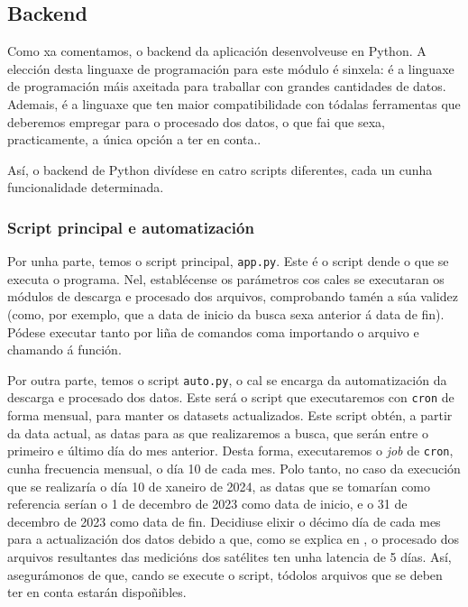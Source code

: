 \subsection{Backend}\label{backend}
Como xa comentamos, o backend da aplicación desenvolveuse en Python. A elección desta linguaxe de programación para este módulo é sinxela: é a linguaxe de programación máis axeitada
para traballar con grandes cantidades de datos. Ademais, é a linguaxe que ten maior compatibilidade con tódalas ferramentas que deberemos empregar para o procesado dos datos, o que
fai que sexa, practicamente, a única opción a ter en conta..

Así, o backend de Python divídese en catro scripts diferentes, cada un cunha funcionalidade determinada.

\subsubsection{Script principal e automatización}\label{app}
Por unha parte, temos o script principal, \texttt{app.py}. Este é o script dende o que se executa o programa. Nel, establécense os parámetros cos cales se executaran os módulos de
descarga e procesado dos arquivos, comprobando tamén a súa validez (como, por exemplo, que a data de inicio da busca sexa anterior á data de fin). Pódese executar tanto por liña de comandos
coma importando o arquivo e chamando á función.

Por outra parte, temos o script \texttt{auto.py}, o cal se encarga da automatización da descarga e procesado dos datos. Este será o script que executaremos con \texttt{cron} de forma mensual,
para manter os datasets actualizados. Este script obtén, a partir da data actual, as datas para as que realizaremos a busca, que serán entre o primeiro e último día do mes anterior. Desta
forma, executaremos o \textit{job} de \texttt{cron}, cunha frecuencia mensual, o día 10 de cada mes. Polo tanto, no caso da execución que se realizaría o día 10 de xaneiro de 2024, as
datas que se tomarían como referencia serían o 1 de decembro de 2023 como data de inicio, e o 31 de decembro de 2023 como data de fin. Decidiuse elixir o décimo día de cada mes para
a actualización dos datos debido a que, como se explica en \cite{s5pdata}, o procesado dos arquivos resultantes das medicións dos satélites ten unha latencia de 5 días. Así, asegurámonos
de que, cando se execute o script, tódolos arquivos que se deben ter en conta estarán dispoñibles.



